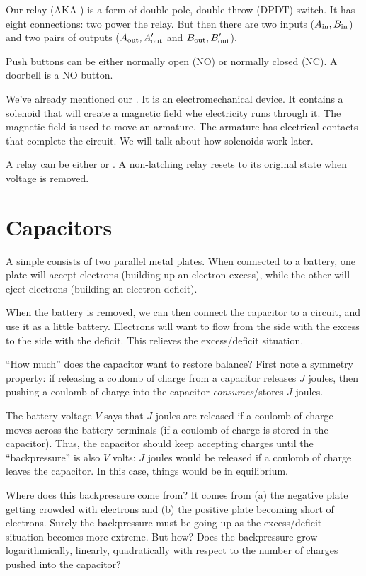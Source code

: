 \documentclass[11pt, oneside]{amsart}
\begin{document}
Our relay (AKA ) is a form of double-pole, double-throw
(DPDT) switch. It has eight connections: two power the relay. But then
there are two inputs ($A_\text{in}, B_\text{in}$) and two pairs of outputs ($A_\text{out},
A'_\text{out}$ and $B_\text{out}, B'_\text{out}$).

Push buttons can be either normally open (NO) or normally closed (NC).
A doorbell is a NO button.

We've already mentioned our . It is an electromechanical
device. It contains a solenoid that will create a magnetic field whe
electricity runs through it. The magnetic field is used to move an
armature. The armature has electrical contacts that complete the
circuit. We will talk about how solenoids work later.

A relay can be either  or . A
non-latching relay resets to its original state when voltage is removed.

\section{Capacitors}

A simple  consists of two parallel metal plates. When
connected to a battery, one plate will accept electrons (building up an
electron excess), while the other will eject electrons (building an
electron deficit).

When the battery is removed, we can then connect the capacitor to a
circuit, and use it as a little battery. Electrons will want to flow
from the side with the excess to the side with the deficit. This
relieves the excess/deficit situation.

``How much'' does the capacitor want to restore balance? First note a
symmetry property: if releasing a coulomb of charge from a capacitor
releases $J$ joules, then pushing a coulomb of charge into the capacitor
\emph{consumes}/stores $J$ joules.

The battery voltage $V$ says that $J$ joules are released if a coulomb
of charge moves across the battery terminals (if a coulomb of charge is
stored in the capacitor). Thus, the capacitor should keep accepting
charges until the ``backpressure'' is also $V$ volts: $J$ joules would
be released if a coulomb of charge leaves the capacitor. In this case,
things would be in equilibrium.

Where does this backpressure come from? It comes from (a) the negative
plate getting crowded with electrons and (b) the positive plate becoming
short of electrons. Surely the backpressure must be going up as the
excess/deficit situation becomes more extreme. But how? Does the
backpressure grow logarithmically, linearly, quadratically with respect
to the number of charges pushed into the capacitor?
\end{document}
